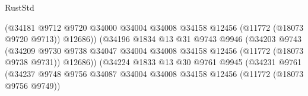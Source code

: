 \begin{lexlean}{RustStd}
\begin{coremodule}
                                                (@34181
                                                  @9712
                                                  @9720
                                                  @34000
                                                  @34004
                                                  @34008
                                                  @34158
                                                  @12456
                                                  (@11772 (@18073 @9720 @9713))
                                                  @12686))
                                              (@34196
                                                @1834
                                                @13
                                                @31
                                                @9743
                                                @9946
                                                (@34203
                                                  @9743
                                                  (@34209
                                                    @9730
                                                    @9738
                                                    @34047
                                                    @34004
                                                    @34008
                                                    @34158
                                                    @12456
                                                    (@11772 (@18073 @9738 @9731))
                                                    @12686))
                                                (@34224
                                                  @1833
                                                  @13
                                                  @30
                                                  @9761
                                                  @9945
                                                  (@34231
                                                    @9761
                                                    (@34237
                                                      @9748
                                                      @9756
                                                      @34087
                                                      @34004
                                                      @34008
                                                      @34158
                                                      @12456
                                                      (@11772 (@18073 @9756 @9749))

\end{coremodule}
\end{lexlean}
